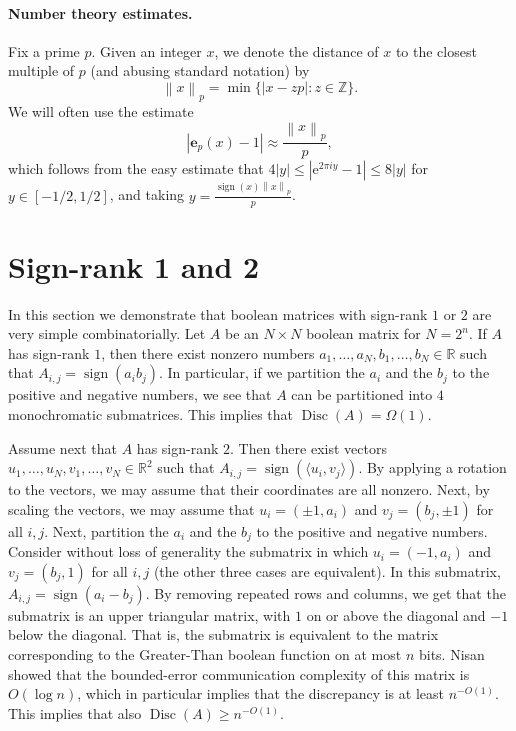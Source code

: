 \documentclass[11pt]{article}
\numberwithin{equation}{section}
\theoremstyle{definition}
\theoremstyle{plain}
\newcommand{\R}{\mathbb R}
\newcommand{\Z}{\mathbb Z}
\newcommand{\eee}{\mathrm e}
\theoremstyle{definition}\newtheorem{problem}[theorem]{Problem}\theoremstyle{plain}
\DeclareMathOperator{\Disc}{Disc}
\DeclareMathOperator{\sign}{sign}
\newcommand{\e}{\mathbf{e}}
\newcommand{\ip}[1]{\langle #1 \rangle}
\newcommand{\norm}[1]{\left\| #1 \right\|_p}
\begin{document}
\paragraph{Number theory estimates.} Fix a prime $p$.
Given an integer $x$, we denote the distance of $x$ to the closest multiple of $p$ (and abusing standard notation) by
$$\norm{x} = \min\{| x - zp |: z\in \Z\}.$$
We will often use the estimate
$$   |\e_p(x)-1|  \approx   \frac{\norm{x}}{p}, $$
which follows from the easy estimate that $4 |y| \le |\eee^{2 \pi i y} - 1| \le 8|y|$ for  $y \in [-1/2,1/2]$, and taking $y = \frac{\sign(x)\norm{x}}{p}$.


\section{ Sign-rank 1 and 2}\label{sec:signrank12}
In this section we demonstrate that boolean matrices with sign-rank $1$ or $2$ are very simple combinatorially. Let $A$ be an $N \times N$ boolean matrix
for $N=2^n$.
If $A$ has sign-rank $1$, then there exist nonzero numbers $a_1,\ldots,a_N, b_1,\ldots,b_N \in \R$ such that $A_{i,j} = \sign(a_i b_j)$. In particular,
if we partition the $a_i$ and the $b_j$ to the positive and negative numbers, we see that $A$ can be partitioned into $4$ monochromatic submatrices. This implies that $\Disc(A) = \Omega(1)$.

Assume next that $A$ has sign-rank $2$. Then there exist vectors $u_1,\ldots,u_N, v_1,\ldots,v_N  \in \R^2$ such that $A_{i,j} = \sign(\ip{u_i,v_j})$.
By applying a rotation to the vectors, we may assume that their coordinates are all nonzero. Next, by scaling the vectors, we may assume that $u_i=(\pm 1,a_i)$ and $v_j = (b_j, \pm 1)$ for all $i,j$.
Next, partition the $a_i$ and the $b_j$ to the positive and negative numbers. Consider without loss of generality the submatrix in which $u_i=(-1,a_i)$ and $v_j = (b_j, 1)$ for all $i,j$ (the other three cases are equivalent). In this submatrix, $A_{i,j} = \sign(a_i - b_j)$. By removing repeated rows and columns, we get that the submatrix is an upper triangular matrix, with $1$ on or above the diagonal and $-1$ below the diagonal. That is, the submatrix is equivalent to the matrix corresponding to the Greater-Than boolean function on at most $n$ bits.
Nisan \cite{nisan1993communication} showed that the bounded-error communication complexity of this matrix is $O(\log n)$, which in particular implies that the discrepancy is at least $n^{-O(1)}$. This implies that also $\Disc(A) \ge n^{-O(1)}$.
\end{document}

